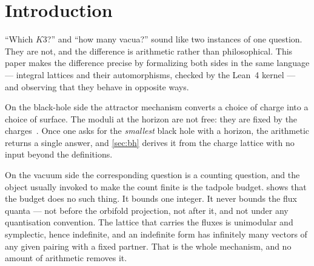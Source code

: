 \documentclass[11pt,a4paper]{article}
\theoremstyle{remark}
\begin{document}
\begin{abstract}
dual-length hypothesis in $^4$He and withdrew its string-theoretic framing. We re-analyse that group's
topological-data-analysis result and find that its measured vortex-line floor, $F=0.943\,\xi$, equals
$\sqrt2\,\Delta x$ to fourteen significant figures with a tenfold degenerate minimum --- a lattice distance, not
yet a physical length. Finally, and methodologically, we report two claims of our own that this apparatus
\emph{failed} to catch and that reading did: a false statement of the crystallographic restriction
($\varphi(n)\le d$, refuted here by four matrices in $SL(6,\mathbb{Z})$ of orders $15,20,24,30$), and a theorem
whose statement was vacuous while its docstring claimed a nerve theorem. Kernel-checked verification certifies
what a proof \emph{depends on}; it is blind to prose nothing depends on and to a statement that says nothing.
All results are checked by the Lean~4 kernel at \texttt{v4.34.0-rc2}; the repository audits $785$ declarations,
$0$ failing, of which $782$ carry mathematical content. The axioms are \texttt{propext},
\texttt{Classical.choice} and \texttt{Quot.sound}.

\end{abstract}

\tableofcontents



\section{Introduction}
\label{sec:intro}

``Which $K3$?'' and ``how many vacua?'' sound like two instances of one question. They are not, and the
difference is arithmetic rather than philosophical. This paper makes the difference precise by formalizing both
sides in the same language --- integral lattices and their automorphisms, checked by the Lean~4 kernel --- and
observing that they behave in opposite ways.

On the black-hole side the attractor mechanism converts a choice of charge into a choice of surface. The moduli
at the horizon are not free: they are fixed by the charges~\cite{Moore1998}. Once one asks for the \emph{smallest}
black hole with a horizon, the arithmetic returns a single answer, and \cref{sec:bh} derives it from the charge
lattice with no input beyond the definitions.

On the vacuum side the corresponding question is a counting question, and the object usually invoked to make the
count finite is the tadpole budget.  shows that the budget does no such thing. It bounds one
integer. It never bounds the flux quanta --- not before the orbifold projection, not after it, and not under any
quantisation convention. The lattice that carries the fluxes is unimodular and symplectic, hence indefinite, and
an indefinite form has infinitely many vectors of any given pairing with a fixed partner. That is the whole
mechanism, and no amount of arithmetic removes it.
\end{document}
